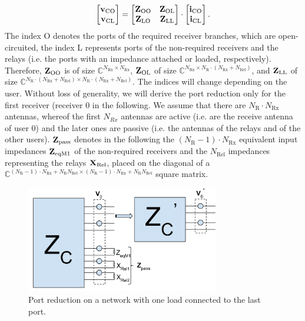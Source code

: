 \begin{align}
\label{eq:ocl_matrix}
\begin{bmatrix}
\mathbf{v}_\text{CO} \\
\mathbf{v}_\text{CL}
\end{bmatrix}
=
\begin{bmatrix}
\mathbf{Z}_\text{OO} & \mathbf{Z}_\text{OL}\\
\mathbf{Z}_\text{LO} & \mathbf{Z}_\text{LL}
\end{bmatrix}\cdot
\begin{bmatrix}
\mathbf{i}_\text{CO} \\
\mathbf{i}_\text{CL}
\end{bmatrix}.
\end{align}
The index O denotes the ports of the required receiver branches, which are open-circuited, the index L represents ports of the non-required receivers and the relays (i.e. the ports with an impedance attached or loaded, respectively).
Therefore, $\mathbf{Z}_\text{OO}$ is of size $\mathbb{C}^{N_\text{Rx}\times N_\text{Rx}}$,
	$\mathbf{Z}_\text{OL}$ of size $\mathbb{C}^{N_\text{Rx}\times N_\text{R}\cdot\left(N_\text{Rx}+N_\text{Rel}\right)}$, and
	$\mathbf{Z}_\text{LL}$ of size $\mathbb{C}^{ N_\text{R}\cdot\left(N_\text{Rx}+N_\text{Rel}\right)\times N_\text{R}\cdot\left(N_\text{Rx}+N_\text{Rel}\right)}$.
The indices will change depending on the user.
Without loss of generality, we will derive the port reduction only for the first receiver (receiver 0 in the following.
We assume that there are $N_\text{R} \cdot N_\text{Rx}$ antennas, whereof the first $N_{Rx}$ antennas are active (i.e. are the receive antenna of user 0) and the later ones are passive (i.e. the antennas of the relays and of the other users).
$\mathbf{Z}_{\text{pass}}$ denotes in the following the $(N_\text{R}-1)\cdot N_\text{Rx}$ equivalent input impedances $\mathbf{Z}_{\text{eqM1}}$ of the non-required receivers and the $N_\text{Rel}$ impedances representing the relays $\mathbf{X}_{\text{Rel}}$, placed on the diagonal of a $\mathbb{C}^
	{(N_\text{R}-1)\cdot N_\text{Rx}+N_\text{R}N_\text{Rel}
	\times (N_\text{R}-1)\cdot N_\text{Rx}+N_\text{R}N_\text{Rel}}$ square matrix.
\begin{figure}[h]
\begin{center}
\includegraphics[width=0.75\textwidth]{images/Port_reduction.png}
\caption{Port reduction on a network with one load connected to the last port.}
\label{fig:port_reduction}
\end{center}
\end{figure}

